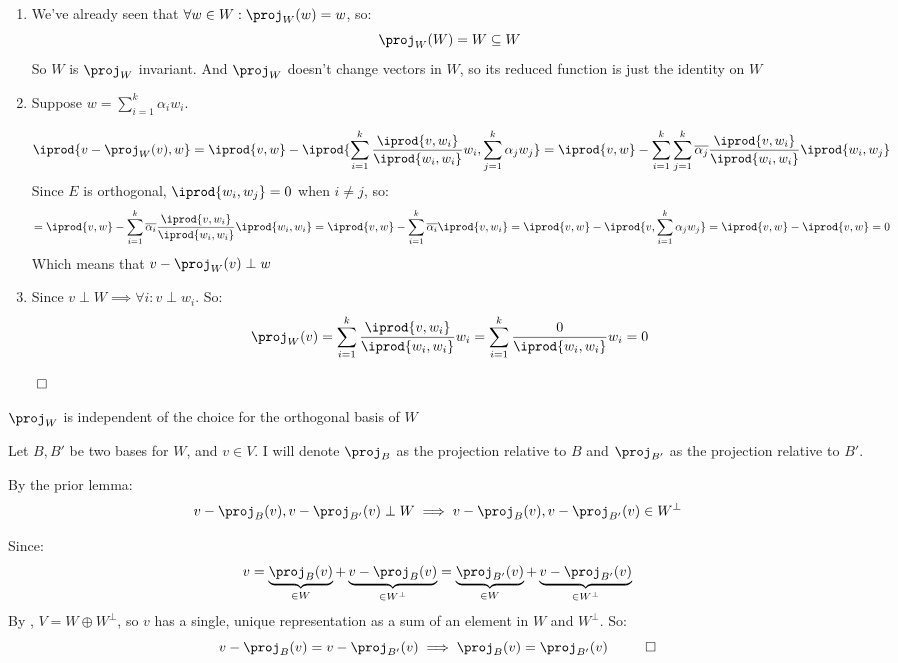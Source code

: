 \documentclass[10pt]{article}
\begin{document}
\begin{lemma*}
\begin{enumerate}
    \item We've already seen that $\forall w\in W:\displaystyle\proj_W(w)=w$, so:
    \[ \proj_W(W) = W \subseteq W \]
    So $W$ is $\displaystyle\proj_W$ invariant. And $\displaystyle\proj_W$ doesn't change vectors in $W$, so its reduced function is just the identity on $W$
    
    \item Suppose $w=\displaystyle\sum_{i=1}^k\alpha_iw_i$.
    
    \[ \iprod{v-\proj_W(v),w} = \iprod{v,w} - \iprod{\sum_{i=1}^k\dfrac{\iprod{v,w_i}}{\iprod{w_i,w_i}}w_i,\sum_{j=1}^k\alpha_jw_j} = \iprod{v,w} - \sum_{i=1}^k\sum_{j=1}^k\overline{\alpha_j}\dfrac{\iprod{v,w_i}}{\iprod{w_i,w_i}}\iprod{w_i, w_j} \]
    Since $E$ is orthogonal, $\iprod{w_i,w_j}=0$ when $i\neq j$, so:
    \[ = \iprod{v,w} - \sum_{i=1}^k\overline{\alpha_i}\dfrac{\iprod{v,w_i}}{\iprod{w_i,w_i}}\iprod{w_i,w_i} = \iprod{v,w} - \sum_{i=1}^k\overline{\alpha_i}\iprod{v,w_i} = \iprod{v,w} - \iprod{v,\sum_{i=1}^k\alpha_jw_j} = \iprod{v,w} - \iprod{v,w} = 0 \]
    Which means that $\displaystyle v-\proj_W(v)\perp w$
    
    \item Since $v\perp W\implies\forall i: v\perp w_i$. So:
    \[ \proj_W(v) = \sum_{i=1}^k\dfrac{\iprod{v,w_i}}{\iprod{w_i,w_i}}w_i = \sum_{i=1}^k\dfrac{0}{\iprod{w_i,w_i}}w_i = 0 \]
\end{enumerate}

$\qed$

\end{lemma*}

\begin{theorem}{$\displaystyle\proj_W$ is independent of the choice for the orthogonal basis of $W$}

Let $B, B'$ be two bases for $W$, and $v\in V$. I will denote $\displaystyle\proj_B$ as the projection relative to $B$ and $\displaystyle\proj_{B'}$ as the projection relative to $B'$.

By the prior lemma:
\[ v-\proj_B(v), v - \proj_{B'}(v) \perp W \implies v-\proj_B(v), v - \proj_{B'}(v) \in W^\perp \]

Since:
\[ v = \underbrace{\proj_B(v)}_{\in W} + \underbrace{v - \proj_B(v)}_{\in W^\perp} = \underbrace{\proj_{B'}(v)}_{\in W} + \underbrace{v - \proj_{B'}(v)}_{\in W^\perp} \]
By , $V=W\oplus W^\perp$, so $v$ has a single, unique representation as a sum of an element in $W$ and $W^\perp$. So:
\[ v - \proj_B(v) = v - \proj_{B'}(v) \implies \proj_B(v) = \proj_{B'}(v) ~~ \qed \]

\end{theorem}
\end{document}
